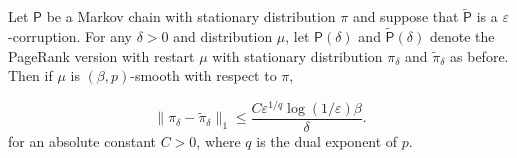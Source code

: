 \documentclass[10pt,a4paper]{amsart}
\begin{document}
\begin{cor}
\label{cor:corrupted_close}
    Let $\mathsf{P}$ be a Markov chain with stationary distribution $\pi$ and suppose that $\widetilde{\mathsf{P}}$ is a $\varepsilon$-corruption. For any $\delta>0$ and distribution $\mu$, let $\mathsf{P}(\delta)$ and $\widetilde{\mathsf{P}}(\delta)$ denote the PageRank version with restart $\mu$ with stationary distribution $\pi_{\delta}$ and $\widetilde{\pi}_{\delta}$ as before. Then if $\mu$  is $(\beta,p)$-smooth with respect to $\pi$, 

    \begin{equation*}
        \|\pi_{\delta}-\widetilde{\pi}_{\delta}\|_1\leq \frac{C\varepsilon^{1/q}\log(1/\varepsilon)\beta}{\delta}. 
    \end{equation*}
    for an absolute constant $C>0$, where $q$ is the dual exponent of $p$.

\end{cor}
\end{document}
